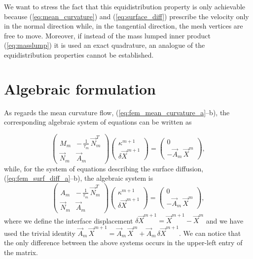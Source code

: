 We want to stress the fact that this equidistribution property is only
achievable because (\ref{eq:mean_curvature}) and (\ref{eq:surface_diff})
prescribe the velocity only in the normal direction while, in the tangential
direction, the mesh vertices are free to move. Moreover, if instead of the mass
lumped inner product (\ref{eq:masslump}) it is used an exact quadrature, an
analogue of the equidistribution properties cannot be established.

\section{Algebraic formulation}\label{sec:geometric_pdes_algebraic}
As regards the mean curvature flow, (\ref{eq:fem_mean_curvature_a}--b), the
corresponding algebraic system of equations can be written as

\begin{equation}\label{eq:algebraic_mean_curvature}
\begin{pmatrix}
M_m & -\,\frac{1}{\tau_m} \, \vec{N}_{m}^{T} \\
\vec{N}_m & \vec{A}_m
\end{pmatrix}
\begin{pmatrix}
\kappa^{m + 1} \\
\delta \vec{X}^{m + 1}
\end{pmatrix}
=
\begin{pmatrix}
0 \\
- \vec{A}_m \, \vec{X}^{m}
\end{pmatrix} ,
\end{equation}
while, for the system of equations describing the surface diffusion,
(\ref{eq:fem_surf_diff_a}--b), the algebraic system is
\begin{equation}\label{eq:algebraic_surf_diff}
\begin{pmatrix}
A_m & - \,\frac{1}{\tau_m}\, \vec{N}_{m}^{T} \\
\vec{N}_m & \vec{A}_m
\end{pmatrix}
\begin{pmatrix}
\kappa^{m + 1} \\
\delta \vec{X}^{m + 1}
\end{pmatrix}
=
\begin{pmatrix}
0 \\
- \vec{A}_m \, \vec{X}^{m}
\end{pmatrix},
\end{equation}
where we define the interface displacement $\delta \vec{X}^{m + 1}=\vec{X}^{m +
1} - \vec{X}^{m}$ and we have used the trivial identity $\vec{A}_m\,\vec{X}^{m
+ 1} = \vec{A}_m\,\vec{X}^{m}+\vec{A}_m\,\delta \vec{X}^{m + 1} $. We can
notice that the only difference between the above systems occurs in the
upper-left entry of the matrix.

